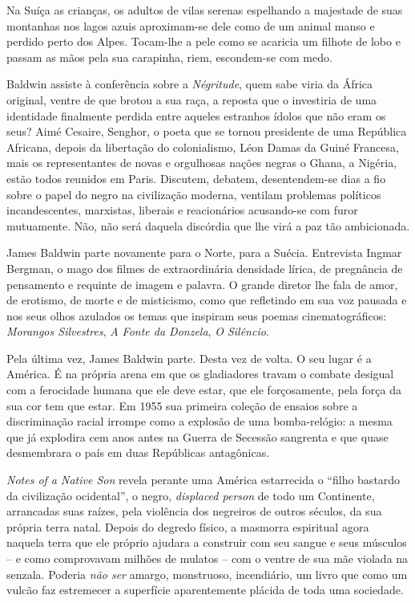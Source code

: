 \documentclass[
  letterpaper,
  DIV=11,
  numbers=noendperiod]{scrreprt}
\begin{document}
Na Suíça as crianças, os adultos de vilas serenas espelhando a majestade
de suas montanhas nos lagos azuis aproximam-se dele como de um animal
manso e perdido perto dos Alpes. Tocam-lhe a pele como se acaricia um
filhote de lobo e passam as mãos pela sua carapinha, riem, escondem-se
com medo.

Baldwin assiste à conferência sobre a \emph{Négritude}, quem sabe viria
da África original, ventre de que brotou a sua raça, a reposta que o
investiria de uma identidade finalmente perdida entre aqueles estranhos
ídolos que não eram os seus? Aimé Cesaire, Senghor, o poeta que se
tornou presidente de uma República Africana, depois da libertação do
colonialismo, Léon Damas da Guiné Francesa, mais os representantes de
novas e orgulhosas nações negras o Ghana, a Nigéria, estão todos
reunidos em Paris. Discutem, debatem, desentendem-se dias a fio sobre o
papel do negro na civilização moderna, ventilam problemas políticos
incandescentes, marxistas, liberais e reacionários acusando-se com furor
mutuamente. Não, não será daquela discórdia que lhe virá a paz tão
ambicionada.

James Baldwin parte novamente para o Norte, para a Suécia. Entrevista
Ingmar Bergman, o mago dos filmes de extraordinária densidade lírica, de
pregnância de pensamento e requinte de imagem e palavra. O grande
diretor lhe fala de amor, de erotismo, de morte e de misticismo, como
que refletindo em sua voz pausada e nos seus olhos azulados os temas que
inspiram seus poemas cinematográficos: \emph{Morangos Silvestres},
\emph{A Fonte da Donzela}, \emph{O Silêncio}.

Pela última vez, James Baldwin parte. Desta vez de volta. O seu lugar é
a América. É na própria arena em que os gladiadores travam o combate
desigual com a ferocidade humana que ele deve estar, que ele
forçosamente, pela força da sua cor tem que estar. Em 1955 sua primeira
coleção de ensaios sobre a discriminação racial irrompe como a explosão
de uma bomba-relógio: a mesma que já explodira cem anos antes na Guerra
de Secessão sangrenta e que quase desmembrara o país em duas Repúblicas
antagônicas.

\emph{Notes of a Native Son} revela perante uma América estarrecida o
``filho bastardo da civilização ocidental'', o negro, \emph{displaced
person} de todo um Continente, arrancadas suas raízes, pela violência
dos negreiros de outros séculos, da sua própria terra natal. Depois do
degredo físico, a masmorra espiritual agora naquela terra que ele
próprio ajudara a construir com seu sangue e seus músculos -- e como
comprovavam milhões de mulatos -- com o ventre de sua mãe violada na
senzala. Poderia \emph{não ser} amargo, monstruoso, incendiário, um
livro que como um vulcão faz estremecer a superfície aparentemente
plácida de toda uma sociedade.
\end{document}
